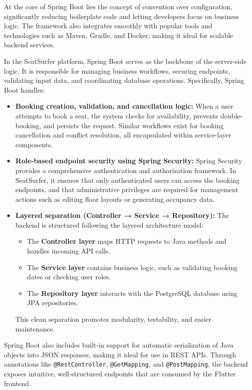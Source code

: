 \documentclass[12pt,a4paper]{report} %
\begin{document}
At the core of Spring Boot lies the concept of convention over configuration, significantly reducing boilerplate code and letting developers focus on business logic. The framework also integrates smoothly with popular tools and technologies such as Maven, Gradle, and Docker, making it ideal for scalable backend services.

In the SeatSurfer platform, Spring Boot serves as the backbone of the server-side logic. It is responsible for managing business workflows, securing endpoints, validating input data, and coordinating database operations. Specifically, Spring Boot handles:

\begin{itemize}
\item \textbf{Booking creation, validation, and cancellation logic:} When a user attempts to book a seat, the system checks for availability, prevents double-booking, and persists the request. Similar workflows exist for booking cancellation and conflict resolution, all encapsulated within service-layer components.
\item \textbf{Role-based endpoint security using Spring Security:} Spring Security provides a comprehensive authentication and authorization framework. In SeatSurfer, it ensures that only authenticated users can access the booking endpoints, and that administrative privileges are required for management actions such as editing floor layouts or generating occupancy data.
\item \textbf{Layered separation (Controller → Service → Repository):} The backend is structured following the layered architecture model:
\begin{itemize}
    \item The \textbf{Controller layer} maps HTTP requests to Java methods and handles incoming API calls.
    \item The \textbf{Service layer} contains business logic, such as validating booking dates or checking user roles.
    \item The \textbf{Repository layer} interacts with the PostgreSQL database using JPA repositories.
\end{itemize}
This clean separation promotes modularity, testability, and easier maintenance.
\end{itemize}

Spring Boot also includes built-in support for automatic serialization of Java objects into JSON responses, making it ideal for use in REST APIs. Through annotations like \texttt{@RestController}, \texttt{@GetMapping}, and \texttt{@PostMapping}, the backend exposes intuitive, well-structured endpoints that are consumed by the Flutter frontend.
\end{document}
